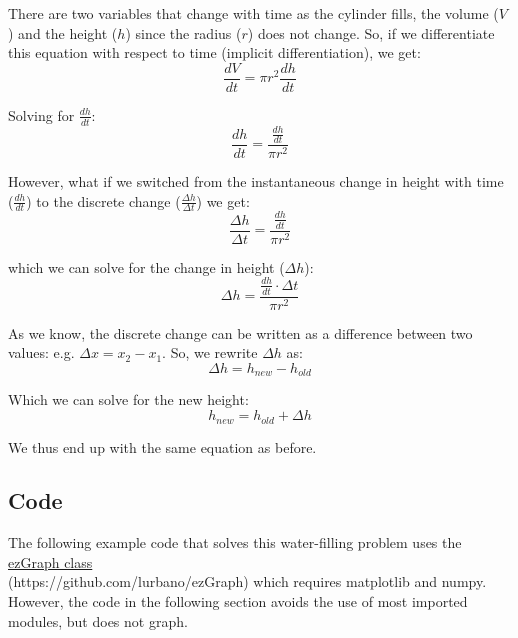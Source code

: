 \documentclass[11pt,fleqn]{article}
\begin{document}
	There are two variables that change with time as the cylinder fills, the volume ($V$) and the height ($h$) since the radius ($r$) does not change. So, if we differentiate this equation with respect to time (implicit differentiation), we get:
		\begin{equation}
			\frac{dV}{dt} = \pi r^2 \frac{dh}{dt} 
		\end{equation}
	
	Solving for $\frac{dh}{dt}$:
		\begin{equation}
			\frac{dh}{dt} = \frac{\frac{dh}{dt} }{\pi r^2 }
		\end{equation}
	
	
	However, what if we switched from the instantaneous change in height with time ($\frac{dh}{dt}$) to the discrete change ($\frac{\Delta h}{\Delta t}$) we get:
		\begin{equation}
			\frac{\Delta h}{\Delta t} = \frac{\frac{dh}{dt} }{\pi r^2 }
		\end{equation}
		
	which we can solve for the change in height ($\Delta h$):
		\begin{equation}
			\Delta h = \frac{\frac{dh}{dt} \cdot \Delta t }{\pi r^2 }
		\end{equation}
	
	As we know, the discrete change can be written as a difference between two values: e.g. $\Delta x = x_2 - x_1$. So, we rewrite $\Delta h$ as:
		\begin{equation}
			\Delta h = h_{new} - h_{old}
		\end{equation}
	
	Which we can solve for the new height:
		\begin{equation}
			h_{new} = h_{old} + \Delta h 
		\end{equation}
	
	We thus end up with the same equation as before.

\newpage
\subsection{Code}

	The following example code that solves this water-filling problem uses the \href{https://github.com/lurbano/ezGraph}{ezGraph class} \\ (https://github.com/lurbano/ezGraph) which requires matplotlib and numpy. However, the code in the following section avoids the use of most imported modules, but does not graph.
	
\end{document}
